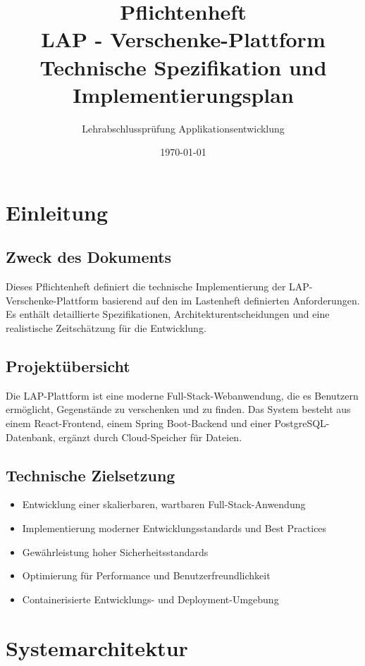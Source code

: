 \documentclass[a4paper,12pt]{article}
\title{
    \huge\textbf{Pflichtenheft}\\
    \Large LAP - Verschenke-Plattform\\
    \large Technische Spezifikation und Implementierungsplan
}
\author{Lehrabschlussprüfung Applikationsentwicklung}
\date{\today}
\begin{document}
\maketitle

\newpage

\tableofcontents

\newpage

\section{Einleitung}

\subsection{Zweck des Dokuments}
Dieses Pflichtenheft definiert die technische Implementierung der LAP-Verschenke-Plattform basierend auf den im Lastenheft definierten Anforderungen. Es enthält detaillierte Spezifikationen, Architekturentscheidungen und eine realistische Zeitschätzung für die Entwicklung.

\subsection{Projektübersicht}
Die LAP-Plattform ist eine moderne Full-Stack-Webanwendung, die es Benutzern ermöglicht, Gegenstände zu verschenken und zu finden. Das System besteht aus einem React-Frontend, einem Spring Boot-Backend und einer PostgreSQL-Datenbank, ergänzt durch Cloud-Speicher für Dateien.

\subsection{Technische Zielsetzung}
\begin{itemize}
    \item Entwicklung einer skalierbaren, wartbaren Full-Stack-Anwendung
    \item Implementierung moderner Entwicklungsstandards und Best Practices
    \item Gewährleistung hoher Sicherheitsstandards
    \item Optimierung für Performance und Benutzerfreundlichkeit
    \item Containerisierte Entwicklungs- und Deployment-Umgebung
\end{itemize}

\section{Systemarchitektur}
\end{document}
